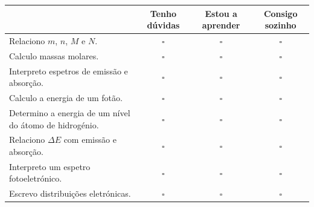 \documentclass[11pt,a4paper]{article}
\begin{document}
	\begin{center}
		
		\small
		
		\begin{tabularx}{\textwidth}{
				>{\raggedright\arraybackslash}X
				c c c
			}
			
			\toprule
			
			&
			\textbf{Tenho dúvidas}
			&
			\textbf{Estou a aprender}
			&
			\textbf{Consigo sozinho}
			\\
			
			\midrule
			
			Relaciono \(m\), \(n\), \(M\) e \(N\).
			&
			\(\square\)&\(\square\)&\(\square\)
			\\[3mm]
			
			Calculo massas molares.
			&
			\(\square\)&\(\square\)&\(\square\)
			\\[3mm]
			
			Interpreto espetros de emissão e absorção.
			&
			\(\square\)&\(\square\)&\(\square\)
			\\[3mm]
			
			Calculo a energia de um fotão.
			&
			\(\square\)&\(\square\)&\(\square\)
			\\[3mm]
			
			Determino a energia de um nível do átomo de hidrogénio.
			&
			\(\square\)&\(\square\)&\(\square\)
			\\[3mm]
			
			Relaciono \(\Delta E\) com emissão e absorção.
			&
			\(\square\)&\(\square\)&\(\square\)
			\\[3mm]
			
			Interpreto um espetro fotoeletrónico.
			&
			\(\square\)&\(\square\)&\(\square\)
			\\[3mm]
			
			Escrevo distribuições eletrónicas.
			&
			\(\square\)&\(\square\)&\(\square\)
			\\
			
			\bottomrule
			
		\end{tabularx}
		
	\end{center}
	
	\vfill
	
	
\end{document}
